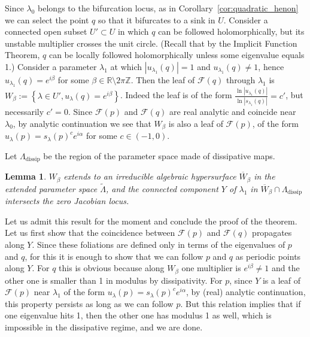 \documentclass[11pt, oneside]{amsart}
\newcommand{\R}{\mathbb{R}}
\newcommand{\Z}{\mathbb{Z}}
\newcommand{\set}[1]{\left\{#1\right\}}
\newcommand{\abs}[1]{\left\vert#1\right\vert}
\newcommand{\la}{\lambda}
\newcommand{\lo}{{\lambda_0}}
\newtheorem{lem}[prop] {Lemma}
\theoremstyle{remark}
\theoremstyle{definition}
\theoremstyle{theorem}
\newcommand{\commentaire}[1]{}
\begin{document}
Since $\lo$ belongs to the bifurcation locus,  as in Corollary~\ref{cor:quadratic_henon} we can 
select the point  $q$ so that it bifurcates to a sink in $U$. 
Consider a connected open subset $U'\subset U$ in
  which $q$ can be followed holomorphically, 
 but its unstable multiplier crosses the unit circle.  
 (Recall that by the Implicit Function Theorem,  $q$ can be locally followed holomorphically unless some eigenvalue equals 1.) Consider  a parameter $\la_1$ at which $\abs{u_{\lambda_1}(q)} = 1$ and $ {u_{\lambda_1}(q)} \neq  1$, hence 
 $u_{\lambda_1}(q) = e^{i\beta}$ for some $\beta\in \R\setminus 2\pi\Z$.  
 Then the leaf of $\mathcal F(q)$ through $\lambda_1$ is 
 $W_\beta:=
 \set{\lambda \in U',  u_{\lambda}(q) = e^{i\beta}}$. Indeed  the leaf is of the form 
  $\frac{\ln\abs{u_{\la_1}(q)}}{\ln\abs{s_{\la_1}(q)}} = c'$, but necessarily  $c'=0$. Since  
 $\mathcal F(p)$ and $\mathcal F(q)$ are real analytic and 
 coincide near $\lo$, by analytic continuation we see that $W_\beta$ is also a 
 leaf of $\mathcal F(p)$, of the form $u_\la(p) = s_\la(p)^c e^{i\alpha}$ for some $c\in(-1, 0)$. 
 
 Let 
$  \Lambda_{\mathrm {dissip}}$ be the region of the   parameter space 
made of dissipative maps. 

 
\begin{lem}\label{lem:algebraic}
$W_\beta$  extends to  an irreducible algebraic hypersurface $\overline{W}_\beta$ in 
 the extended 
  parameter space $\widetilde \Lambda$, and \commentaire{Change here for Major remark \#4}
  the connected component $Y$ 
  of $\lambda_1$ in   $\overline W_\beta\cap \Lambda_{\mathrm{dissip}}$ intersects  the zero Jacobian locus.
\end{lem}
 
Let us admit this result for the moment and conclude the proof of the theorem. 
Let us  first show that the coincidence between 
$\mathcal F(p)$ and $\mathcal F(q)$ propagates along 
$Y$. Since these foliations are defined only in terms of the eigenvalues of $p$ and $q$, for this  it is enough to show that we can follow $p$ and $q$ as periodic points along $Y$. For $q$ this is obvious because along $W_\beta$ 
one multiplier is 
$e^{i\beta}\neq 1$ and the other one is smaller than 1 in modulus 
by dissipativity. 
For $p$, since $Y$ is a leaf of $\mathcal F(p)$ near $\lambda_1$ of the form 
$u_\la (p) = s_\la (p)^c e^{i\alpha}$, 
by (real) analytic continuation, this property persists as long as we can follow $p$. 
But    this relation implies that if one eigenvalue hits 1, then the other one has modulus 1 as well, which is impossible in the dissipative regime, and we are done. 
\end{document}
